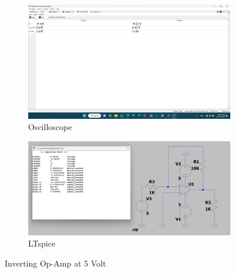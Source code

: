 \documentclass{zc-ust-hw}
\begin{document}
\maketitle

\begin{figure}[htpb]
  \centering
  \begin{subfigure}[b]{0.45\textwidth}
    \includegraphics[width=\textwidth]{figures/inv-opamp-5v.png}
    \caption{Oscilloscope}
  \end{subfigure}
  \hfill
  \begin{subfigure}[b]{0.45\textwidth}
    \includegraphics[width=\textwidth]{figures/inv-opamp-5v-lts.png}
    \caption{LTspice}
  \end{subfigure}
  \caption{Inverting Op-Amp at 5 Volt}
\end{figure}
\end{document}
